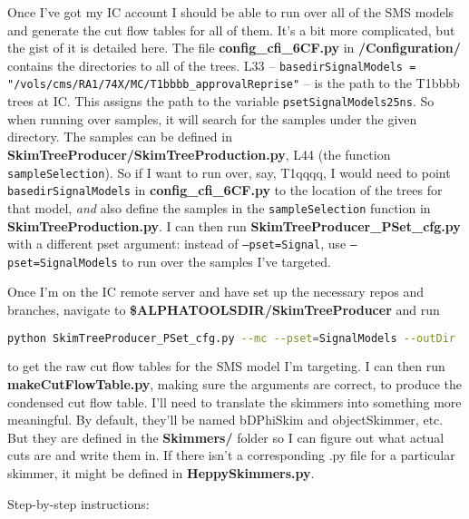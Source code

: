 Once I've got my IC account I should be able to run over all of the SMS models and generate the cut flow tables for all of them. It's a bit more complicated, but the gist of it is detailed here. The file \textbf{config\_cfi\_6CF.py} in \textbf{/Configuration/} contains the directories to all of the trees. L33 -- \texttt{basedirSignalModels = "/vols/cms/RA1/74X/MC/T1bbbb\_approvalReprise"} -- is the path to the T1bbbb trees at IC. This assigns the path to the variable \texttt{psetSignalModels25ns}. So when running over samples, it will search for the samples under the given directory. The samples can be defined in \textbf{SkimTreeProducer/SkimTreeProduction.py}, L44 (the function \verb!sampleSelection!). So if I want to run over, say, T1qqqq, I would need to point \texttt{basedirSignalModels} in \textbf{config\_cfi\_6CF.py} to the location of the trees for that model, \emph{and} also define the samples in the \texttt{sampleSelection} function in \textbf{SkimTreeProduction.py}. I can then run \textbf{SkimTreeProducer\_PSet\_cfg.py} with a different pset argument: instead of \texttt{--pset=Signal}, use \texttt{--pset=SignalModels} to run over the samples I've targeted.

Once I'm on the IC remote server and have set up the necessary repos and branches, navigate to \textbf{\$ALPHATOOLSDIR/SkimTreeProducer} and run

\begin{lstlisting}[belowskip=-0.7cm, language=sh, numbers=none]
python SkimTreeProducer_PSet_cfg.py --mc --pset=SignalModels --outDir ./
\end{lstlisting}

to get the raw cut flow tables for the SMS model I'm targeting. I can then run \textbf{makeCutFlowTable.py}, making sure the arguments are correct, to produce the condensed cut flow table. I'll need to translate the skimmers into something more meaningful. By default, they'll be named bDPhiSkim and objectSkimmer, etc. But they are defined in the \textbf{Skimmers/} folder so I can figure out what actual cuts are and write them in. If there isn't a corresponding .py file for a particular skimmer, it might be defined in \textbf{HeppySkimmers.py}.

Step-by-step instructions:

